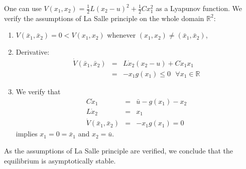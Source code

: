 One can use $V(x_1,x_2)=\frac{1}{2}L(x_2-u)^2+\frac{1}{2}Cx_1^2$ as a Lyapunov function. We verify the assumptions of La Salle principle on the whole domain $\mathbb{R}^2$:
\begin{enumerate}
\item $V(\bar{x}_1,\bar{x}_2)=0<V(x_1,x_2)$ whenever $(x_1,x_2)\neq (\bar{x}_1,\bar{x}_2)$,
\item Derivative:
$$
\begin{array}{rcl}
\dot{V}(\bar{x}_1,\bar{x}_2)&=& L\dot{x}_2(x_2-u)+C\dot{x}_1x_1\\
&=& -x_1g(x_1)\leq 0\text{ }\forall x_1\in\mathbb{R}
\end{array}
$$

\item We verify that
$$
\begin{array}{rcl}
C\dot{x}_1&=&\bar{u}-g(x_1)-x_2\\
L\dot{x}_2&=&x_1\\
\dot{V}(\bar{x}_1,\bar{x}_2) &=& -x_1g(x_1)=0
\end{array}
$$
implies $x_1=0=\bar{x}_1$ and $x_2=\bar{u}$.
\end{enumerate}
As the assumptions of La Salle principle are verified, we conclude that the equilibrium is asymptotically stable.
